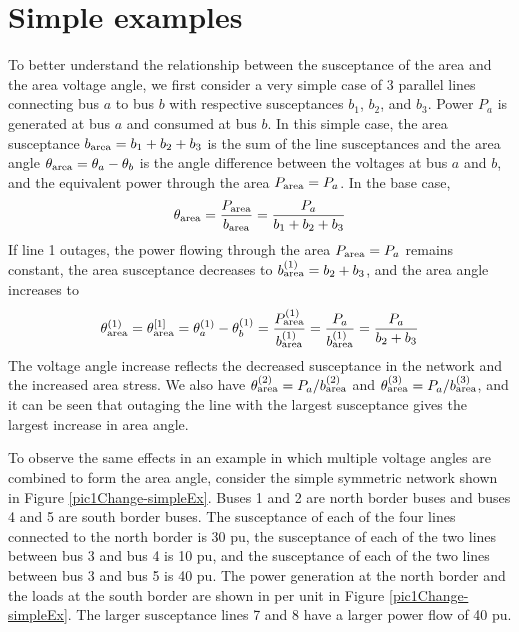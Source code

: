 \documentclass[conference]{IEEEtran}
\begin{document}
\section{Simple examples}
To better understand the relationship between the susceptance of the area and the area voltage angle, we first consider a very simple case of 3 parallel lines connecting bus $a$ to bus $b$ with respective susceptances $b_1$, $b_2$, and $b_3$. Power $P_a$ is generated at bus $a$ and consumed at bus $b$.  In this simple case, the area susceptance $b_{\rm area}=b_1+b_2+b_3$ is the sum of the line susceptances and the area angle 
$\theta_{\rm area}=\theta_a-\theta_b$ is the angle difference between the voltages at bus $a$ and $b$, and the equivalent power  
through the area $P_{\rm area}=P_a$.
In the base case,
\begin{align}
 \theta_{\rm area} =\frac{P_{\rm area}}{b_{\rm area}}=\frac{P_a}{b_1+b_2+b_3}
  \end{align}
If line 1 outages, the power flowing through the area $P_{\rm area}=P_a$ remains constant, the area susceptance 
decreases to  $b_{\rm area}^{(1)}=b_2+b_3$, and the area angle increases to 
 \begin{align}
 \theta_{\rm area}^{(1)}
 = \theta_{\rm area}^{[1]}
 =\theta_a^{(1)}-\theta_b^{(1)}
 =\frac{P_{\rm area}^{(1)}}{b_{\rm area}^{(1)}}
 =\frac{P_a}{b_{\rm area}^{(1)}}
 =\frac{P_a}{b_2+b_3}
 \end{align}
 The voltage angle increase reflects the decreased susceptance in the network and the increased area stress.
 We also have  $\theta_{\rm area}^{(2)}=
 P_a/b_{\rm area}^{(2)}$ and $\theta_{\rm area}^{(3)}=
 P_a/b_{\rm area}^{(3)}$, and it can be seen that outaging the line with the largest susceptance gives the 
 largest increase in area angle.
 
To observe the same  effects in an example in which multiple voltage angles are combined to form the area angle, consider  the simple symmetric 
network shown in  Figure \ref{pic1Change-simpleEx}.
 Buses 1 and 2 are north border buses and buses 4 and 5 are south border buses.  The susceptance of  each of the four  lines connected to the north border is 30 pu, the susceptance of each of the two lines between bus  3 and bus  4 is 10 pu, and the susceptance of each of the two lines between bus 3 and bus 5 is 40 pu. The power generation at the north border and the loads at the south border are shown in per unit in Figure \ref{pic1Change-simpleEx}.
 The larger susceptance lines 7 and 8 have a larger power flow of 40 pu.
 
\end{document}
